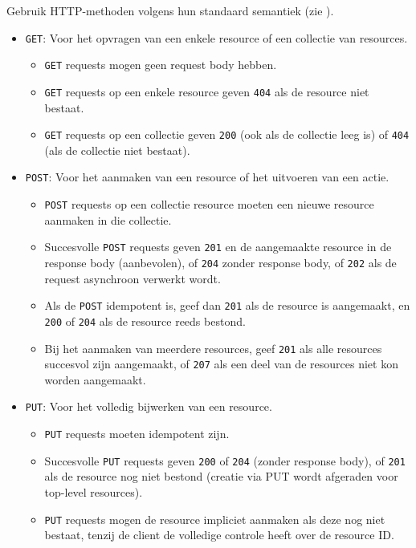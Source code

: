 Gebruik HTTP-methoden volgens hun standaard semantiek (zie \autocite{rfc9110}).

\begin{itemize}
    \item \texttt{GET}: Voor het opvragen van een enkele resource of een collectie van resources.
    \begin{itemize}
        \item \texttt{GET} requests mogen geen request body hebben.
        \item \texttt{GET} requests op een enkele resource geven \texttt{404} als de resource niet bestaat.
        \item \texttt{GET} requests op een collectie geven \texttt{200} (ook als de collectie leeg is) of \texttt{404} (als de collectie niet bestaat).
    \end{itemize}
    \item \texttt{POST}: Voor het aanmaken van een resource of het uitvoeren van een actie.
    \begin{itemize}
        \item \texttt{POST} requests op een collectie resource moeten een nieuwe resource aanmaken in die collectie.
        \item Succesvolle \texttt{POST} requests geven \texttt{201} en de aangemaakte resource in de response body (aanbevolen), of \texttt{204} zonder response body, of \texttt{202} als de request asynchroon verwerkt wordt.
        \item Als de \texttt{POST} idempotent is, geef dan \texttt{201} als de resource is aangemaakt, en \texttt{200} of \texttt{204} als de resource reeds bestond.
        \item Bij het aanmaken van meerdere resources, geef \texttt{201} als alle resources succesvol zijn aangemaakt, of \texttt{207} als een deel van de resources niet kon worden aangemaakt.
    \end{itemize}
    \item \texttt{PUT}: Voor het volledig bijwerken van een resource.
    \begin{itemize}
        \item \texttt{PUT} requests moeten idempotent zijn.
        \item Succesvolle \texttt{PUT} requests geven \texttt{200} of \texttt{204} (zonder response body), of \texttt{201} als de resource nog niet bestond (creatie via PUT wordt afgeraden voor top-level resources).
        \item \texttt{PUT} requests mogen de resource impliciet aanmaken als deze nog niet bestaat, tenzij de client de volledige controle heeft over de resource ID.

\end{itemize}
\end{itemize}
